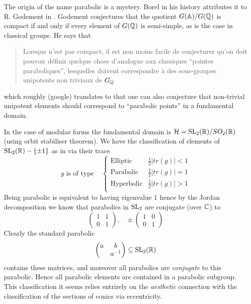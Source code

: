 \begin{Remark}
    The origin of the name parabolic is a mystery. Borel in his history \cite[VI.\S 2]{EssaysHistoryLie} attributes it to R. Godement in \cite{godementGroupesLineairesAlgebriques}. Godement conjectures that the quotient \(G(\A) / G(\Q)\) is compact if and only if every element of \(G(\Q)\) is semi-simple, as is the case in classical groups.  He says that 
    \begin{quote}
        Lorsque n'est pas compact, il est non moins facile de conjecturer qu’on doit pouvoir définir quelque chose d’analogue aux classiques ``pointes paraboliques'', lesquelles doivent correspondre à des  sous-groupes unipotents non triviaux de \(G_\Q\)
    \end{quote}
    which roughly (google) translates to that one can also conjecture that non-trivial unipotent elements should correspond to ``parabolic points'' in a fundamental domain.

    In the case of modular forms the fundamental domain is \(\mathcal{H} = \SL_2(\R)/SO_2(\R)\) (using orbit stabiliser theorem). We have the classification of elements of  \(\SL_2(\R) -\{\pm 1\}\) as in \cite[3.5]{borelAutomorphicFormsSL21997} via their trace
    \[g\text{ is of type } \;\;\; 
    \begin{cases}
        \text{Elliptic } & \frac{1}{2}|tr(g)| < 1 \\
        \text{Parabolic } & \frac{1}{2}|tr(g)| = 1 \\
        \text{Hyperbolic} & \frac{1}{2}|tr(g)| > 1 \\
    \end{cases}
    \]
    Being parabolic is equivalent to having eigenvalue 1 hence by the Jordan decomposition we know that parabolics in \(\operatorname{SL}_2\) are conjugate (over \(\C\)) to 
    \[\begin{pmatrix}
        1 & 1\\
        0 & 1
    \end{pmatrix},\;\;\; \pm\begin{pmatrix}
        1 & 0\\
        0 & 1
    \end{pmatrix}\]
    Clearly the standard parabolic 
    \[\begin{pmatrix}
        a & b \\
         & a\inv
    \end{pmatrix} \subseteq \SL_2(\R)\]
    contains these matrices, and moreover all parabolics are \textit{conjugate} to this parabolic. Hence all parabolic elements are contained in a parabolic subgroup. This classification it seems relies entrirely on the \textit{aesthetic} connection with the classification of the sections of conics via eccentricity.


\end{Remark}
